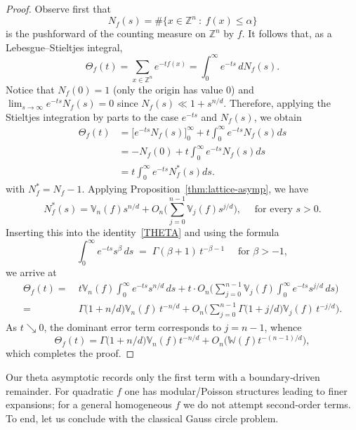 \documentclass[11pt]{article}
\theoremstyle{definition}
\numberwithin{equation}{section}
\newcommand{\Z}{\mathbb{Z}}
\newcommand{\opV}{\mathds{V}}       %
\begin{document}
\begin{proof}
Observe first that 
\[
    N_f(s) = \# \big\{ x \in \Z^n ~:~ f(x) \leq \alpha \big\}
\]
is the pushforward of the counting measure  on $\mathbb{Z}^n$ by $f$.
It follows that, as a Lebesgue–Stieltjes integral,
\[
  \Theta_f(t)
  = \sum_{x\in\mathbb{Z}^n} e^{-t f(x)}
  = \int_0^\infty e^{-t s}\,dN_f(s).
\]
Notice that $N_f( 0) = 1$ (only the origin has value $0$) and $\textstyle\lim_{s \to \infty} e^{-ts}N_f(s) = 0$ since $N_f(s) \ll 1 + s^{n/d}$. 
Therefore, applying the Stieltjes integration by parts to the case $e^{-ts}$ and $N_f(s)$, we obtain
\begin{equation}\label{THETA}
    \begin{split}
    \Theta_f(t)
  &= \big[e^{-ts}N_f(s)\big]_{0}^{\infty}
  + t\int_0^\infty e^{-ts}N_f(s)ds\\
  &= -N_f(0) + t\int_0^\infty e^{-ts}N_f(s)ds\\
  &= t\int_0^\infty e^{-ts}N_f^\ast(s)ds.
  \end{split}
\end{equation}
with $N_f^\ast=N_f-1$. Applying Proposition~\ref{thm:lattice-asymp}, we have
\[
  N_f^\ast(s)
  = \opV_n(f) s^{n/d}
    + O_n \!\Big(\sum_{j=0}^{n-1} \opV_j (f) s^{j/d}\Big), \quad \text{ for every } s > 0.
\]
Inserting this into the identity~\eqref{THETA} and using the formula
\[
  \int_0^\infty e^{-ts}s^\beta\,ds \;=\; \Gamma(\beta+1)\,t^{-\beta-1}
  \quad \text{ for } \beta > - 1,
\]
we arrive at
\[
\begin{aligned}
  \Theta_f(t)
    = & ~ t\opV_n(f) \int_0^\infty e^{-ts}s^{n/d}\,ds
     + t  \cdot O_n \Bigg(
     \sum_{j=0}^{n-1}\opV_j(f)\int_0^\infty e^{-ts}s^{j/d}\,ds
     \Bigg)
     \\
    = & ~ 
    \Gamma \big(1+ n/d \big) \opV_n(f)\,t^{-n/d}
     +
     O_n
     \Bigg(
     \sum_{j=0}^{n-1}\Gamma\big(1+j/d\big) \opV_j(f)\,t^{-j/d}
     \Bigg).
\end{aligned}
\]
As $t \searrow 0$, the dominant error term corresponds to $j = n-1$, whence
\[
  \Theta_f(t)
  = 
  \Gamma\big(1+ n/d \big) \opV_n(f)t^{-n/d}
    + O_n\!\big(\mathds W(f) t^{-(n-1)/d}\big),
\]
which completes the proof.
\end{proof}

Our theta asymptotic records only the first term with a boundary‑driven remainder.  
For quadratic $f$ one has modular/Poisson structures leading to finer expansions; for a general homogeneous $f$ we do not attempt second‐order terms.  
To end, let us conclude with the classical Gauss circle problem.
\end{document}
